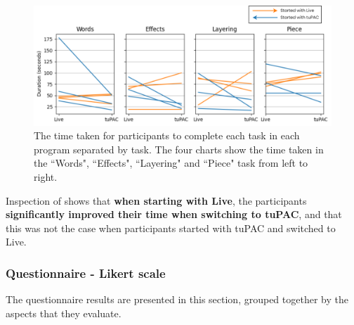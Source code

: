\documentclass[12pt,a4paper,oneside,openright]{report}
\begin{document}
\begin{figure}[h!]
    \centering
    \includegraphics[scale=0.25]{images/time_data.png}
    \caption{The time taken for participants to complete each task in each program separated by task. The four charts show the time taken in the ``Words", ``Effects", ``Layering" and ``Piece" task from left to right.}
    \label{fig:change_per_task}
\end{figure}


Inspection of  shows that \textbf{when starting with Live}, the participants  \textbf{significantly improved their time when switching to tuPAC}, and that this was not the case when participants started with tuPAC and switched to Live.

\subsubsection{Questionnaire - Likert scale}
The questionnaire results are presented in this section, grouped together by the aspects that they evaluate.
\end{document}
